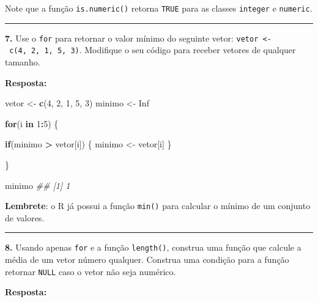 \documentclass[]{book}
\newenvironment{Shaded}{\begin{snugshade}}{\end{snugshade}}
\newcommand{\CommentTok}[1]{\textcolor[rgb]{0.56,0.35,0.01}{\textit{#1}}}
\newcommand{\ControlFlowTok}[1]{\textcolor[rgb]{0.13,0.29,0.53}{\textbf{#1}}}
\newcommand{\DecValTok}[1]{\textcolor[rgb]{0.00,0.00,0.81}{#1}}
\newcommand{\KeywordTok}[1]{\textcolor[rgb]{0.13,0.29,0.53}{\textbf{#1}}}
\newcommand{\NormalTok}[1]{#1}
\newcommand{\OperatorTok}[1]{\textcolor[rgb]{0.81,0.36,0.00}{\textbf{#1}}}
\newcommand{\OtherTok}[1]{\textcolor[rgb]{0.56,0.35,0.01}{#1}}
\newcommand{\StringTok}[1]{\textcolor[rgb]{0.31,0.60,0.02}{#1}}
\begin{document}
Note que a função \texttt{is.numeric()} retorna \texttt{TRUE} para as classes \texttt{integer} e \texttt{numeric}.

\begin{center}\rule{0.5\linewidth}{\linethickness}\end{center}

\textbf{7.} Use o \texttt{for} para retornar o valor mínimo do seguinte vetor: \texttt{vetor\ \textless{}-\ c(4,\ 2,\ 1,\ 5,\ 3)}. Modifique o seu código para receber vetores de qualquer tamanho.

\textbf{Resposta:}

\begin{Shaded}
\begin{Highlighting}[]

\NormalTok{vetor <-}\StringTok{ }\KeywordTok{c}\NormalTok{(}\DecValTok{4}\NormalTok{, }\DecValTok{2}\NormalTok{, }\DecValTok{1}\NormalTok{, }\DecValTok{5}\NormalTok{, }\DecValTok{3}\NormalTok{)}
\NormalTok{minimo <-}\StringTok{ }\OtherTok{Inf}

\ControlFlowTok{for}\NormalTok{(i }\ControlFlowTok{in} \DecValTok{1}\OperatorTok{:}\DecValTok{5}\NormalTok{) \{}
  
  \ControlFlowTok{if}\NormalTok{(minimo }\OperatorTok{>}\StringTok{ }\NormalTok{vetor[i]) \{}
\NormalTok{    minimo <-}\StringTok{ }\NormalTok{vetor[i]}
\NormalTok{  \}}
  
\NormalTok{\}}

\NormalTok{minimo}
\CommentTok{## [1] 1}
\end{Highlighting}
\end{Shaded}

\textbf{Lembrete}: o R já possui a função \texttt{min()} para calcular o mínimo de um conjunto de valores.

\begin{center}\rule{0.5\linewidth}{\linethickness}\end{center}

\textbf{8.} Usando apenas \texttt{for} e a função \texttt{length()}, construa uma função que calcule a média de um vetor número qualquer. Construa uma condição para a função retornar \texttt{NULL} caso o vetor não seja numérico.

\textbf{Resposta:}
\end{document}
